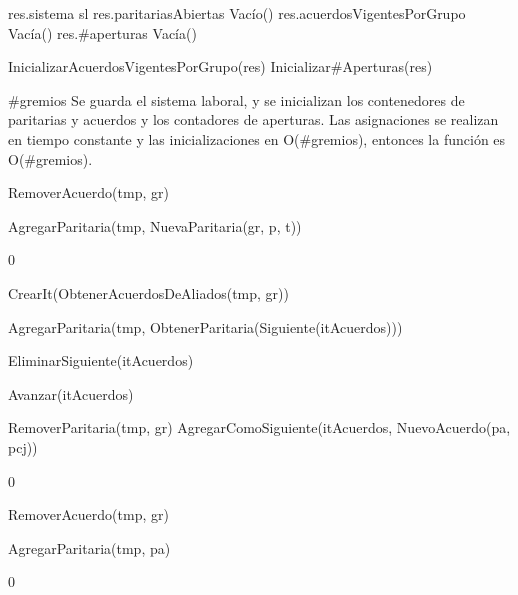{
	\state res.sistema \asig sl								
	\state res.paritariasAbiertas \asig Vacío()				
	\state res.acuerdosVigentesPorGrupo \asig Vacía()		
	\state res.\#aperturas \asig Vacía()					
	\state

	\state InicializarAcuerdosVigentesPorGrupo(res)			
	\state Inicializar\#Aperturas(res)						
}
{\#gremios}
{ Se guarda el sistema laboral, y se inicializan los contenedores de paritarias y acuerdos y los contadores de aperturas. Las asignaciones se realizan en tiempo constante y las inicializaciones en O(\#gremios), entonces la función es O(\#gremios). }

{
						
		\state RemoverAcuerdo(tmp, gr)							
	\endif
	\state

	\state AgregarParitaria(tmp, NuevaParitaria(gr, p, t))		
}
{0}
{\addtocounter{lipsumcounter}{1}}

{

	\state {} \asig CrearIt(ObtenerAcuerdosDeAliados(tmp, gr))		
			
		\state

		\state AgregarParitaria(tmp, ObtenerParitaria(Siguiente(itAcuerdos)))		

		\state EliminarSiguiente(itAcuerdos)										

		\state
		\state Avanzar(itAcuerdos)													
	\endwhile
	\state

	\state {} \asig RemoverParitaria(tmp, gr)				
	\state AgregarComoSiguiente(itAcuerdos, NuevoAcuerdo(pa, pcj))			
}
{0}
{\addtocounter{lipsumcounter}{1}}

{
	\state {} \asig RemoverAcuerdo(tmp, gr)			

	\state AgregarParitaria(tmp, pa)									
}
{0}
{\addtocounter{lipsumcounter}{1}}

